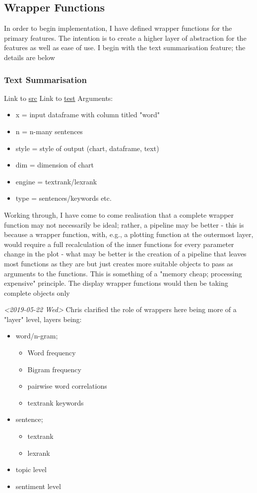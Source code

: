 \documentclass[a4paper, 11pt]{article}
\begin{document}
\subsection{Wrapper Functions}
\label{sec:org9b2ea0d}
In order to begin implementation, I have defined wrapper functions for
the primary features. The intention is to create a higher layer of
abstraction for the features as well as ease of use. I begin with the
text summarisation feature; the details are below
\subsubsection{Text Summarisation}
\label{sec:orgb01f65c}
Link to \href{file:///home/user/curr/stats-781/src/summ-wrapper.R}{src}
Link to \href{file:///home/user/curr/stats-781/test/summ-wrapper-test.R}{test}
Arguments:
\begin{itemize}
\item x = input dataframe with column titled "word"
\item n = n-many sentences
\item style = style of output (chart, dataframe, text)
\item dim = dimension of chart
\item engine = textrank/lexrank
\item type = sentences/keywords etc.
\end{itemize}

Working through, I have come to come realisation that a complete
wrapper function may not necessarily be ideal; rather, a pipeline may
be better - this is because a wrapper function, with, e.g., a plotting
function at the outermost layer, would require a full recalculation of
the inner functions for every parameter change in the plot - what may
be better is the creation of a pipeline that leaves most functions as
they are but just creates more suitable objects to pass as arguments
to the functions. This is something of a "memory cheap; processing
expensive" principle. The display wrapper functions would then be
taking complete objects only 

\textit{<2019-05-22 Wed> } Chris clarified the role of wrappers here being more
of a "layer" level, layers being:
\begin{itemize}
\item word/n-gram;
\begin{itemize}
\item Word frequency
\item Bigram frequency
\item pairwise word correlations
\item textrank keywords
\end{itemize}
\item sentence;
\begin{itemize}
\item textrank
\item lexrank
\end{itemize}
\item topic level
\item sentiment level
\end{itemize}
\end{document}
